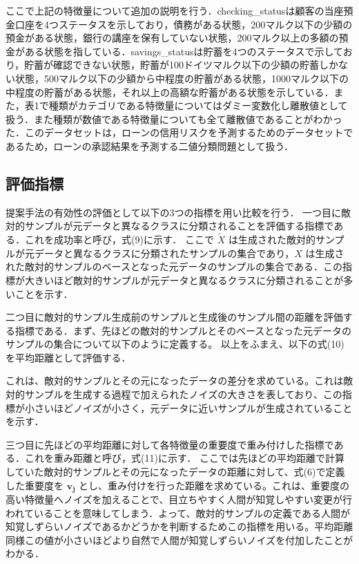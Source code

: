 ここで上記の特徴量について追加の説明を行う．checking\_statusは顧客の当座預金口座を4つステータスを示しており，債務がある状態，200マルク以下の少額の預金がある状態，銀行の講座を保有していない状態，200マルク以上の多額の預金がある状態を指している．savings\_statusは貯蓄を4つのステータスで示しており，貯蓄が確認できない状態，貯蓄が100ドイツマルク以下の少額の貯蓄しかない状態，500マルク以下の少額から中程度の貯蓄がある状態，1000マルク以下の中程度の貯蓄がある状態，それ以上の高額な貯蓄がある状態を示している．また，表1で種類がカテゴリである特徴量についてはダミー変数化し離散値として扱う．また種類が数値である特徴量についても全て離散値であることがわかった．このデータセットは，ローンの信用リスクを予測するためのデータセットであるため，ローンの承認結果を予測する二値分類問題として扱う．

\subsection{評価指標}
提案手法の有効性の評価として以下の3つの指標を用い比較を行う．
一つ目に敵対的サンプルが元データと異なるクラスに分類されることを評価する指標である．これを成功率と呼び，式(9)に示す．
ここで $\tilde{X}$ は生成された敵対的サンプルが元データと異なるクラスに分類されたサンプルの集合であり，$X$ は生成された敵対的サンプルのベースとなった元データのサンプルの集合である．この指標が大きいほど敵対的サンプルが元データと異なるクラスに分類されることが多いことを示す．

二つ目に敵対的サンプル生成前のサンプルと生成後のサンプル間の距離を評価する指標である．まず、先ほどの敵対的サンプルとそのベースとなった元データのサンプルの集合について以下のように定義する。
以上をふまえ、以下の式(10)を平均距離として評価する．

これは、敵対的サンプルとその元になったデータの差分を求めている。これは敵対的サンプルを生成する過程で加えられたノイズの大きさを表しており、この指標が小さいほどノイズが小さく，元データに近いサンプルが生成されていることを示す．

三つ目に先ほどの平均距離に対して各特徴量の重要度で重み付けした指標である．これを重み距離と呼び，式(11)に示す．
ここでは先ほどの平均距離で計算していた敵対的サンプルとその元になったデータの距離に対して、式(6)で定義した重要度を $\bm{v_j}$ とし、重み付けを行った距離を求めている。これは、重要度の高い特徴量へノイズを加えることで、目立ちやすく人間が知覚しやすい変更が行われていることを意味してしまう．よって、敵対的サンプルの定義である人間が知覚しずらいノイズであるかどうかを判断するためこの指標を用いる。平均距離同様この値が小さいほどより自然で人間が知覚しずらいノイズを付加したことがわかる．

